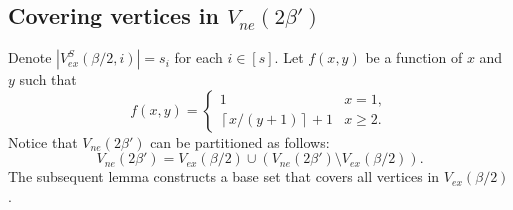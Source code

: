 \documentclass[11pt, a4paper]{article}
\theoremstyle{definition}
\newcommand{\<}{\subseteq}
\begin{document}
\subsection{Covering vertices in  $V_{ne}(2\beta')$}\label{section7.1}


Denote  $|V_{ex}^S(\beta/2,i)|=s_i$ for each $i\in [s]$. Let $f(x,y)$ be a function of $x$ and $y$ such that 
\begin{equation*}
f(x,y)= \left\{
\begin{array}{ll}
	1 & x=1, \\
     \left \lceil x/(y+1)\right \rceil +1 & x\ge 2 .
\end{array}\right.
\end{equation*}
Notice that $V_{ne}(2\beta')$ can be partitioned as follows:
$$
V_{ne}(2\beta')=V_{ex}(\beta/2)\cup (V_{ne}(2\beta')\setminus V_{ex}(\beta/2)). %
$$
The subsequent lemma constructs a base set that covers all vertices in $V_{ex}(\beta/2)$. 


\end{document}
